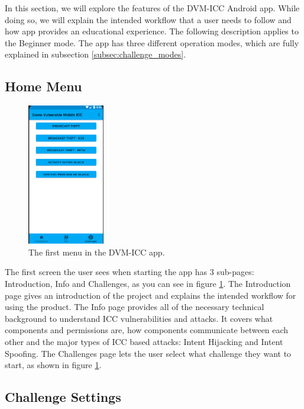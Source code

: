     In this section, we will explore the features of the DVM-ICC Android app. While doing so, we will explain the intended workflow that a user needs to follow and how app provides an educational experience. The following description applies to the Beginner mode. The app has three different operation modes, which are fully explained in subsection \ref{subsec:challenge_modes}.
    
    \subsection{Home Menu}
        \label{subsec:home_menu}
        
    \begin{figure}
        \centering
        \includegraphics[width=0.3\textwidth]{graphics/home_activity.PNG}
        \caption{The first menu in the DVM-ICC app.}
        \label{fig:home_menu}
    \end{figure}
        
    The first screen the user sees when starting the app has 3 sub-pages: Introduction, Info and Challenges, as you can see in figure \ref{fig:home_menu}. The Introduction page gives an introduction of the project and explains the intended workflow for using the product. The Info page provides all of the necessary technical background to understand ICC vulnerabilities and attacks. It covers what components and permissions are, how components communicate between each other and the major types of ICC based attacks: Intent Hijacking and Intent Spoofing. The Challenges page lets the user select what challenge they want to start, as shown in figure \ref{fig:home_menu}.
    
    \subsection{Challenge Settings}
        \label{subsec:challenge_settings}
        
